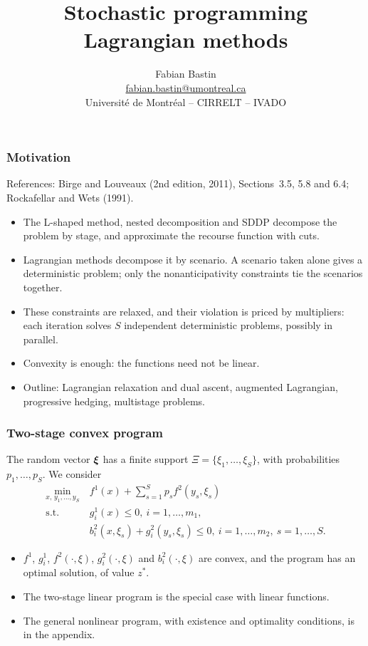 \documentclass[aspectratio=169]{beamer}
\title[Stochastic Lagrangian]{Stochastic programming\\Lagrangian methods}
\author[Fabian Bastin]{Fabian Bastin \\ \texorpdfstring{\url{fabian.bastin@umontreal.ca}}{fabian.bastin@umontreal.ca} \\ Université de Montréal -- CIRRELT -- IVADO}
\date{}
\begin{document}
\frame{\titlepage}

\begin{frame}
\frametitle{Motivation}

{\red References}: Birge and Louveaux (2nd edition, 2011), Sections~3.5, 5.8 and 6.4; Rockafellar and Wets (1991).

\mbox{}

\begin{itemize}
\item
The L-shaped method, nested decomposition and SDDP decompose the problem {\blue by stage}, and approximate the recourse function with cuts.
\item
Lagrangian methods decompose it {\blue by scenario}. A scenario taken alone gives a deterministic problem; only the {\red nonanticipativity constraints} tie the scenarios together.
\item
These constraints are relaxed, and their violation is priced by multipliers: each iteration solves $S$ independent deterministic problems, possibly in parallel.
\item
Convexity is enough: the functions need not be linear.
\item
Outline: Lagrangian relaxation and dual ascent, augmented Lagrangian, progressive hedging, multistage problems.
\end{itemize}

\end{frame}

\begin{frame}
\frametitle{Two-stage convex program}

The random vector ${\boldsymbol{\xi}}$ has a finite support $\Xi = \lbrace \xi_1, \ldots, \xi_S \rbrace$, with probabilities $p_1, \ldots, p_S$.
We consider
\begin{align*}
\min_{x,\, y_1, \ldots, y_S}\ & f^1(x) + \sum_{s=1}^S p_s f^2(y_s,\xi_s) \\
\mbox{s.t. } & g_i^1(x) \leq 0,\ i = 1,\ldots,m_1, \\
& b_i^2(x,\xi_s) + g_i^2(y_s, \xi_s) \leq 0,\ i = 1,\ldots,m_2,\ s = 1,\ldots,S.
\end{align*}

\begin{itemize}
\item
$f^1$, $g_i^1$, $f^2(\cdot,\xi)$, $g_i^2(\cdot,\xi)$ and $b_i^2(\cdot,\xi)$ are convex, and the program has an optimal solution, of value $z^*$.
\item
The two-stage linear program is the special case with linear functions.
\item
The general nonlinear program, with existence and optimality conditions, is in the appendix.
\end{itemize}

\end{frame}
\end{document}
